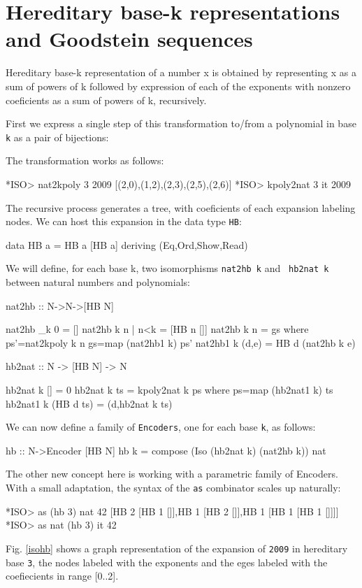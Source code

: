 \documentclass[]{INCLUDES/llncs}
\begin{document}
\section{Hereditary base-k representations and Goodstein sequences}

\begin{df}
Hereditary base-k representation of a number x is obtained by representing x as
a sum of powers of k followed by expression of each of the exponents with
nonzero coeficients as a sum of powers of k, recursively.
\end{df}
First we express a single step of this transformation to/from a polynomial in
base {\tt k} as a pair of bijections:
The transformation works as follows:
\begin{codex}
*ISO> nat2kpoly 3 2009
[(2,0),(1,2),(2,3),(2,5),(2,6)]
*ISO> kpoly2nat 3 it
2009
\end{codex}
The recursive process generates a tree, with coeficients of each
expansion labeling nodes. We can host this expansion in the data type {\tt HB}:
\begin{code}
data HB a = HB a [HB a]  deriving (Eq,Ord,Show,Read)
\end{code}
We will define, for each base k, two isomorphisms {\tt nat2hb k} and {\tt
hb2nat k} between natural numbers and polynomials:
\begin{code}
nat2hb :: N->N->[HB N]

nat2hb _k 0 = [] 
nat2hb k n | n<k = [HB n []]
nat2hb k n = gs where 
  ps'=nat2kpoly k n
  gs=map (nat2hb1 k) ps'
  nat2hb1 k (d,e) = HB d (nat2hb k e)
 
hb2nat :: N -> [HB N] -> N
 
hb2nat k [] = 0
hb2nat k ts = kpoly2nat k ps where
  ps=map (hb2nat1 k) ts
  hb2nat1 k (HB d ts) = (d,hb2nat k ts)
\end{code}
We can now define a family of {\tt Encoders}, one for each base {\tt k}, as
follows:
\begin{code}
hb :: N->Encoder [HB N]
hb k = compose (Iso (hb2nat k) (nat2hb k)) nat
\end{code}
The other new concept here is working with a parametric family of Encoders. With
a small adaptation, the syntax of the {\tt as} combinator scales up naturally:
\begin{codex}
*ISO> as  (hb 3) nat 42
[HB 2 [HB 1 []],HB 1 [HB 2 []],HB 1 [HB 1 [HB 1 []]]]
*ISO> as nat (hb 3) it
42
\end{codex}
Fig. \ref{isohb} shows a graph representation of the expansion of {\tt 2009}
in hereditary base {\tt 3}, the nodes labeled with the exponents and the
eges labeled with the coefiecients in range [0..2].
\end{document}
